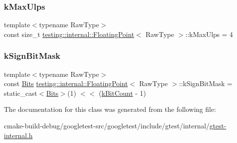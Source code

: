 \subsubsection{\texorpdfstring{kMaxUlps}{kMaxUlps}}
{\footnotesize\ttfamily template$<$typename Raw\+Type$>$ \\
const size\+\_\+t \mbox{\hyperlink{classtesting_1_1internal_1_1FloatingPoint}{testing\+::internal\+::\+Floating\+Point}}$<$ Raw\+Type $>$\+::k\+Max\+Ulps = 4\hspace{0.3cm}{\ttfamily [static]}}

\mbox{\label{classtesting_1_1internal_1_1FloatingPoint_aca98b5ea6f2222a66a82e52421682efa}} 
\subsubsection{\texorpdfstring{kSignBitMask}{kSignBitMask}}
{\footnotesize\ttfamily template$<$typename Raw\+Type$>$ \\
const \mbox{\hyperlink{classtesting_1_1internal_1_1FloatingPoint_abf228bf6cd48f12c8b44c85b4971a731}{Bits}} \mbox{\hyperlink{classtesting_1_1internal_1_1FloatingPoint}{testing\+::internal\+::\+Floating\+Point}}$<$ Raw\+Type $>$\+::k\+Sign\+Bit\+Mask = static\+\_\+cast$<$\mbox{\hyperlink{classtesting_1_1internal_1_1FloatingPoint_abf228bf6cd48f12c8b44c85b4971a731}{Bits}}$>$(1) $<$$<$ (\mbox{\hyperlink{classtesting_1_1internal_1_1FloatingPoint_ab819d2e8f93e9e482373999f0f8d71b9}{k\+Bit\+Count}} -\/ 1)\hspace{0.3cm}{\ttfamily [static]}}



The documentation for this class was generated from the following file\+:\begin{DoxyCompactItemize}
\item 
cmake-\/build-\/debug/googletest-\/src/googletest/include/gtest/internal/\mbox{\hyperlink{gtest-internal_8h}{gtest-\/internal.\+h}}\end{DoxyCompactItemize}
